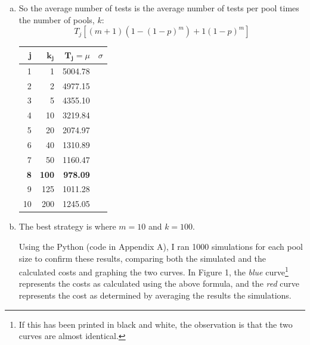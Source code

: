 \documentclass[11pt]{extarticle}
\begin{document}
\begin{enumerate}[(a)]
\item  So the average number of tests is the average number of tests per pool times the number of pools, $k$: $$T_j \left[ (m+1)(1-(1-p)^m) + 1(1-p)^m \right] $$
\begin{table}[H]
\centering
\begin{tabular}{rrrl}
\toprule
\textbf{j} & $\mathbf{k_j}$ & $\mathbf{T_j} = \mu$ & $\sigma$  \\
\midrule
1 & 1 &  5004.78\\
2 & 2 & 4977.15\\
3 & 5 & 4355.10\\
4 & 10 & 3219.84\\
5 & 20 & 2074.97\\
6 & 40 & 1310.89\\
7 & 50 & 1160.47\\
\textbf{8} & \textbf{100} & \textbf{978.09}\\
9 & 125 & 1011.28\\
10 & 200 & 1245.05 \\
\bottomrule
\end{tabular}
\end{table}





\item The best strategy is where $m = 10$ and $k=100$.

Using the Python (code in Appendix A), I ran 1000 simulations for each pool size to confirm these results, comparing both the simulated and the calculated costs and graphing the two curves. In Figure 1, the \textit{blue} curve\footnote{If this has been printed in black and white, the observation is that the two curves are almost identical.} represents the costs as calculated using the above formula, and the \textit{red} curve represents the cost as determined by averaging the results the simulations.


\end{enumerate}
\end{document}
